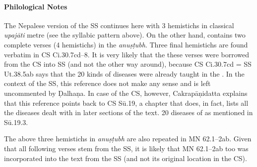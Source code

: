 \paragraph*{Philological Notes} 
The Nepalese version of the SS continues here with 3 hemistichs in classical 
\textit{upajāti} metre (see the syllabic pattern above). On the other hand, 
\cite{vulgate} contains two complete verses (4 hemistichs) in the 
\textit{anuṣṭubh}. Three final hemistichs are found verbatim in CS Ci.30.7cd--8. It 
is very likely that the these verses were borrowed from the CS into SS (and not 
the other way around), because CS Ci.30.7cd = SS Ut.38.5ab says that the 20 
kinds of diseases were already taught in the . In the context of the SS, this reference does not make any sense and 
is left uncommented by Ḍalhaṇa. In case of the CS, however, Cakrapāṇidatta 
explains that this reference points back to CS Sū.19, a chapter that does, in fact, 
lists all the diseases dealt with in later sections of the text. 20 diseases of 
 as mentioned in Sū.19.3.

The above three hemistichs in \textit{anuṣṭubh} are also repeated in MN 
62.1--2ab. Given that all following verses stem from the SS, it is likely that MN 
62.1--2ab too was incorporated into the text from the SS (and not its original 
location in the CS).   

